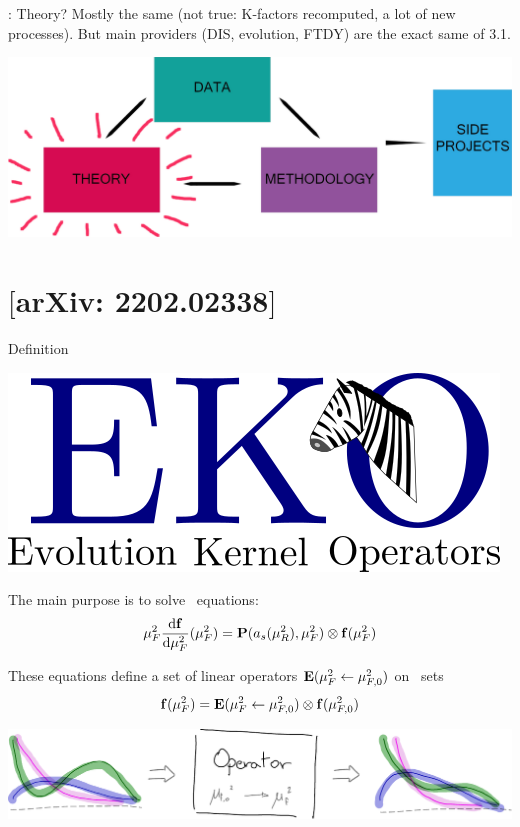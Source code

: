 \documentclass[9pt]{beamer}
\providecommand{\iRef}[1]{{\color{mLightGreen}\small $[$#1$]$}}
\begin{document}
\begin{frame}{: Theory?}
    Mostly the same (not true: K-factors recomputed, a lot of new processes).
    But main providers (DIS, evolution, FTDY) are the exact same of 3.1.


    \begin{center}
        \includegraphics[width=0.7\linewidth]{organization}
    \end{center}
\end{frame}

\section{\eko{} \iRef{arXiv: 2202.02338}}

\begin{frame}{\eko{} Definition}
    \begin{center}
            \includegraphics[width=.35\linewidth]{eko}
    \end{center}

    The main purpose is to solve \textbf{\dglap}\ equations:
    \begin{equation*}
            \muF^2 \dv{\vb f}{\muF^2}{}(\muF^2) = \vb P (a_s(\muR^2),\muF^2) \otimes \vb f(\muF^2)
    \end{equation*}

    These equations define a set of linear operators $\vb E(\mu_F^2 \leftarrow
    \mu_{F,0}^2)$ on \textbf{\pdf}\ sets
    \begin{equation*}
            \vb f(\mu_F^2) = \vb E(\mu_F^2 \leftarrow \mu_{F,0}^2) \otimes \vb f(\mu_{F,0}^2)
    \end{equation*}

    \vspace*{15pt}
    \begin{center}
            \includegraphics[width=0.7\linewidth]{ev-op}
    \end{center}
\end{frame}
\end{document}
